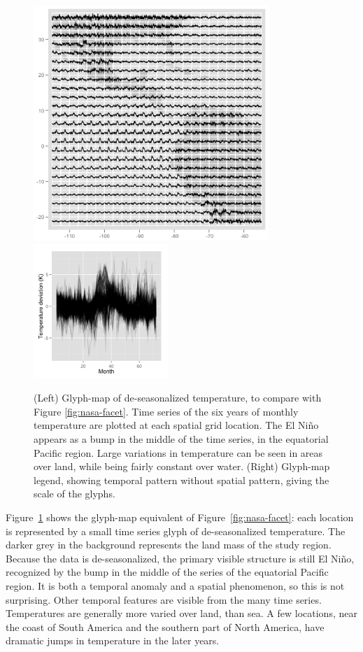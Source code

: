 \documentclass[oneside]{article}
\begin{document}
\begin{figure}[htbp]
  \centering
  \includegraphics[width=3.5in]{nasa-deseas-glyph}
  \includegraphics[width=2in]{nasa-deseas-glyph-leg}
  \caption{(Left) Glyph-map of de-seasonalized temperature, to compare with Figure \ref{fig:nasa-facet}. Time series of the six years of monthly temperature are plotted at each spatial grid location. The El Ni\~no appears as a bump in the middle of the time series, in the equatorial Pacific region. Large variations in temperature can be seen in areas over land, while being fairly constant over water. (Right) Glyph-map legend, showing temporal pattern without spatial pattern, giving the scale of the glyphs.}
  \label{fig:nasa-glyph}
\end{figure}

Figure~\ref{fig:nasa-glyph} shows the glyph-map equivalent of Figure~\ref{fig:nasa-facet}: each location is represented by a small time series glyph of de-seasonalized temperature. The darker grey in the background represents the land mass of the study region. Because the data is de-seasonalized, the primary visible structure is still El Ni\~no, recognized by the bump in the middle of the series of the equatorial Pacific region. It is both a temporal anomaly and a spatial phenomenon, so this is not surprising. Other temporal features are visible from the many time series. Temperatures are generally more varied over land, than sea. A few locations, near the coast of South America and the southern part of North America, have dramatic jumps in temperature in the later years.%
\end{document}
